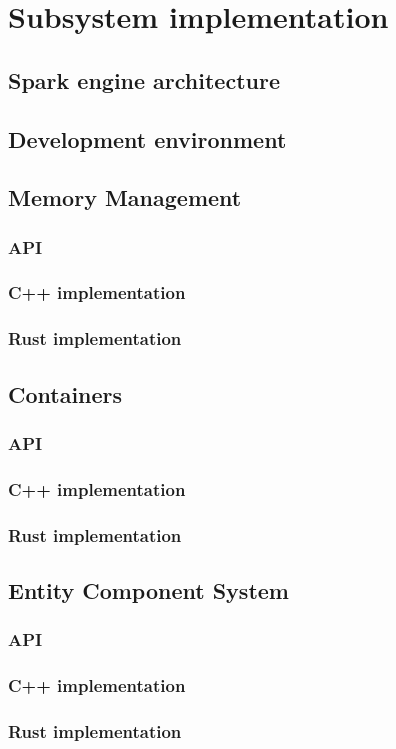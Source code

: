 \chapter{Subsystem implementation}
\blindtext
\section{Spark engine architecture}
\blindtext
\section{Development environment}
\blindtext
\section{Memory Management} \label{mem_impl}
\blindtext
\subsection{API}
\blindtext
\subsection{C++ implementation}
\blindtext
\subsection{Rust implementation}
\blindtext
\section{Containers} \label{container_impl}
\blindtext
\subsection{API}
\blindtext
\subsection{C++ implementation}
\blindtext
\subsection{Rust implementation}
\blindtext
\section{Entity Component System} \label{ecs_impl}
\blindtext
\subsection{API}
\blindtext
\subsection{C++ implementation}
\blindtext
\subsection{Rust implementation}
\blindtext
